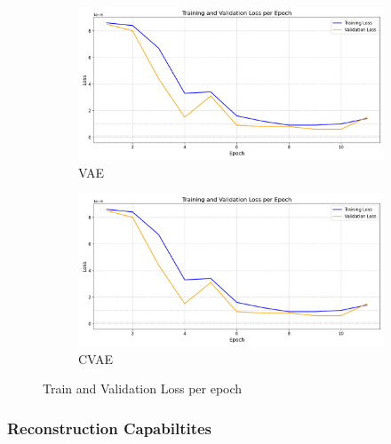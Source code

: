 \begin{figure}[!htbp]
  \begin{subfigure}[t]{.6\textwidth}
    \centering
    \includegraphics[width=\linewidth]{figures/losses/ae.png}
    \caption{VAE}
  \end{subfigure}
  \hfill
  \begin{subfigure}[t]{.6\textwidth}
    \centering
    \includegraphics[width=\linewidth]{figures/losses/ae.png}
    \caption{CVAE}
  \end{subfigure}
  \caption{Train and Validation Loss per epoch}
\end{figure}

\subsubsection{Reconstruction Capabiltites}

